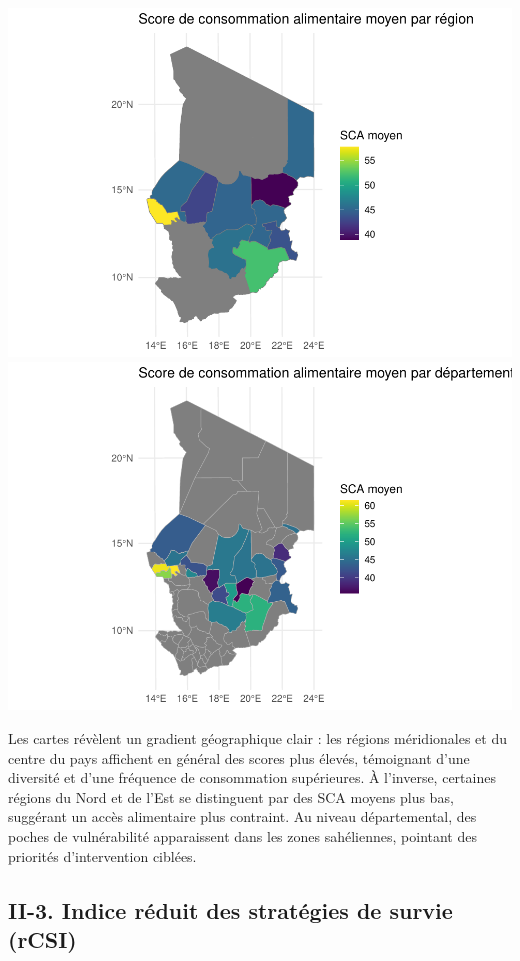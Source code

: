 \documentclass[
]{article}
\begin{document}
\includegraphics{Rapport_PAN_files/figure-latex/sca_map-1.pdf}
\includegraphics{Rapport_PAN_files/figure-latex/sca_map-2.pdf}

Les cartes révèlent un gradient géographique clair : les régions
méridionales et du centre du pays affichent en général des scores plus
élevés, témoignant d'une diversité et d'une fréquence de consommation
supérieures. À l'inverse, certaines régions du Nord et de l'Est se
distinguent par des SCA moyens plus bas, suggérant un accès alimentaire
plus contraint. Au niveau départemental, des poches de vulnérabilité
apparaissent dans les zones sahéliennes, pointant des priorités
d'intervention ciblées.

\hypertarget{ii-3.-indice-ruxe9duit-des-stratuxe9gies-de-survie-rcsi}{%
\subsection{II-3. Indice réduit des stratégies de survie
(rCSI)}\label{ii-3.-indice-ruxe9duit-des-stratuxe9gies-de-survie-rcsi}}
\end{document}
